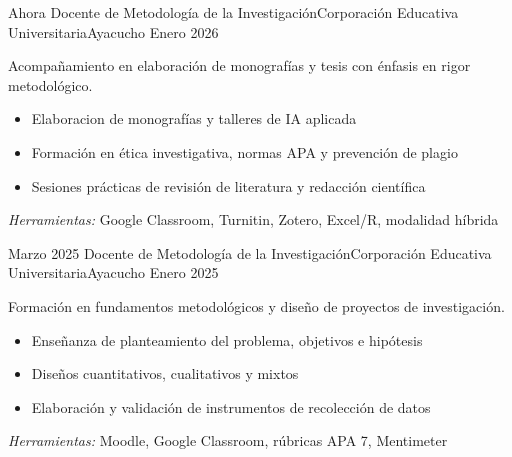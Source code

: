 
\begin{experiences}
	

\experience
{Ahora} {Docente de Metodología de la Investigación}{Corporación Educativa Universitaria}{Ayacucho}
{Enero 2026} {
	Acompañamiento en elaboración de monografías y tesis con énfasis en rigor metodológico.
	\begin{itemize}
		\item Elaboracion de monografías y talleres de IA aplicada
		\item Formación en ética investigativa, normas APA y prevención de plagio
		\item Sesiones prácticas de revisión de literatura y redacción científica
	\end{itemize}
}
{\footnotesize{\emph{Herramientas:} Google Classroom, Turnitin, Zotero, Excel/R, modalidad híbrida}}
\emptySeparator

\experience
{Marzo 2025} {Docente de Metodología de la Investigación}{Corporación Educativa Universitaria}{Ayacucho}
{Enero 2025} {
	Formación en fundamentos metodológicos y diseño de proyectos de investigación.
	\begin{itemize}
		\item Enseñanza de planteamiento del problema, objetivos e hipótesis
		\item Diseños cuantitativos, cualitativos y mixtos
		\item Elaboración y validación de instrumentos de recolección de datos
	\end{itemize}
}
{\footnotesize{\emph{Herramientas:} Moodle, Google Classroom, rúbricas APA 7, Mentimeter}}
\emptySeparator



\end{experiences}
